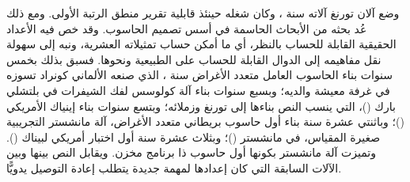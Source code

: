 \documentclass[../../../include/open-logic-section]{subfiles}
\begin{document}
\begin{history}
وضع آلان تورنغ آلاته سنة ، وكان شغله حينئذ قابلية تقرير منطق الرتبة الأولى. ومع ذلك عُد بحثه من الأبحاث الحاسمة في أسس تصميم الحاسوب. وقد خص فيه الأعداد الحقيقية القابلة للحساب بالنظر، أي ما أمكن حساب تمثيلاته العشرية، ونبه إلى سهولة نقل مفاهيمه إلى الدوال القابلة للحساب على الطبيعية ونحوها. فسبق بذلك بخمس سنوات بناء الحاسوب العامل متعدد الأغراض سنة ، الذي صنعه الألماني كونراد تسوزه في غرفة معيشة والديه؛ وبسبع سنوات بناء آلة كولوسس لفك الشيفرات في بلتشلي بارك ()، التي ينسب النص بناءها إلى تورنغ وزملائه؛ وبتسع سنوات بناء إينياك الأمريكي ()؛ وباثنتي عشرة سنة بناء أول حاسوب بريطاني متعدد الأغراض، آلة مانشستر التجريبية صغيرة المقياس، في مانشستر ()؛ وبثلاث عشرة سنة أول اختبار أمريكي لبيناك (). وتميزت آلة مانشستر بكونها أول حاسوب ذا برنامج مخزن. ويقابل النص بينها وبين الآلات السابقة التي كان إعدادها لمهمة جديدة يتطلب إعادة التوصيل يدويًّا.
\end{history}
\end{document}
